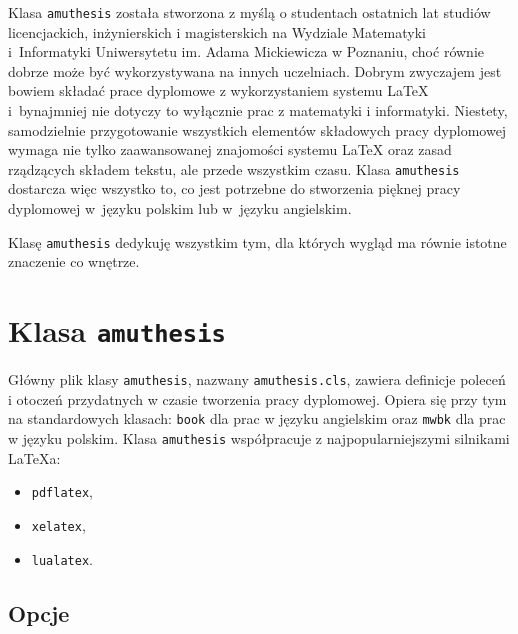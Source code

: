\documentclass[oneside]{amuthesis}
\date{Poznań, wrzesień 2017}
\begin{document}
\maketitle

\begin{streszczenie}
Klasa \texttt{amuthesis} została stworzona z myślą o studentach ostatnich lat studiów licencjackich, inżynierskich i magisterskich na Wydziale Matematyki i~Informatyki Uniwersytetu im. Adama Mickiewicza w Poznaniu, choć równie dobrze może być wykorzystywana na innych uczelniach. Dobrym zwyczajem jest bowiem składać prace dyplomowe z wykorzystaniem systemu \LaTeX{} i~bynajmniej nie dotyczy to wyłącznie prac z matematyki i informatyki. Niestety, samodzielnie przygotowanie wszystkich elementów składowych pracy dyplomowej wymaga nie tylko zaawansowanej znajomości systemu \LaTeX{} oraz zasad rządzących składem tekstu, ale przede wszystkim czasu. Klasa \texttt{amuthesis} dostarcza więc wszystko to, co jest potrzebne do stworzenia pięknej pracy dyplomowej w~języku polskim lub w~języku angielskim.
\end{streszczenie}

\begin{dedykacja}
Klasę \texttt{amuthesis} dedykuję wszystkim tym, dla których wygląd ma równie istotne znaczenie co wnętrze.
\end{dedykacja}

\tableofcontents

\chapter{Klasa \texttt{amuthesis}}

Główny plik klasy \texttt{amuthesis}, nazwany \texttt{amuthesis.cls}, zawiera definicje poleceń i otoczeń przydatnych w czasie tworzenia pracy dyplomowej. Opiera się przy tym na standardowych klasach: \texttt{book} dla prac w języku angielskim oraz \texttt{mwbk} dla prac w języku polskim. Klasa \texttt{amuthesis} współpracuje z najpopularniejszymi silnikami \LaTeX{}a:
\begin{itemize}
  \item \texttt{pdflatex},
  \item \texttt{xelatex},
  \item \texttt{lualatex}.
\end{itemize}

\section{Opcje}
\end{document}
